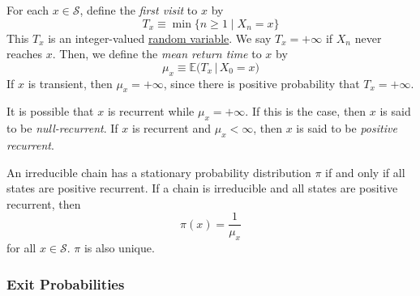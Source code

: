   \begin{definition}
    \label{def:first-visit}
    For each $x \in \mathcal{S}$, define the \textit{first visit} to $x$ by 
    \begin{equation}
      T_x \equiv \min\{ n \geq 1 \; | \; X_n = x\}
    \end{equation}
    This $T_x$ is an integer-valued \hyperref[def:random-variable]{random variable}. We say $T_x = + \infty$ if $X_n$ never reaches $x$. Then, we define the \textit{mean return time} to $x$ by 
    \begin{equation}
      \mu_x \equiv \mathbb{E}\big( T_x \, | \, X_0 = x)
    \end{equation}
    If $x$ is transient, then $\mu_x = + \infty$, since there is positive probability that $T_x = + \infty$. 
  \end{definition}

  \begin{definition}
    \label{def:null-recurrent-and-positive-recurrent-states}
    It is possible that $x$ is recurrent while $\mu_x = +\infty$. If this is the case, then $x$ is said to be \textit{null-recurrent}. If $x$ is recurrent and $\mu_x < \infty$, then $x$ is said to be \textit{positive recurrent}. 
  \end{definition}

  \begin{theorem}
    \label{thm:stationary-distribution-and-positive-recurrence}
    An irreducible chain has a stationary probability distribution $\pi$ if and only if all states are positive recurrent. If a chain is irreducible and all states are positive recurrent, then 
    \begin{equation}
      \pi(x) = \frac{1}{\mu_x}
    \end{equation}
    for all $x \in \mathcal{S}$. $\pi$ is also unique. 
  \end{theorem}

  \subsubsection{Exit Probabilities}

